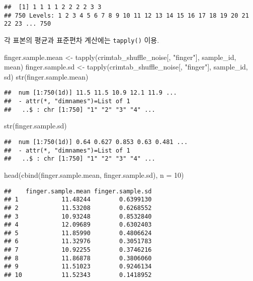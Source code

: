 \documentclass[
]{article}
\newenvironment{Shaded}{\begin{snugshade}}{\end{snugshade}}
\newcommand{\AttributeTok}[1]{\textcolor[rgb]{0.77,0.63,0.00}{#1}}
\newcommand{\DecValTok}[1]{\textcolor[rgb]{0.00,0.00,0.81}{#1}}
\newcommand{\FunctionTok}[1]{\textcolor[rgb]{0.00,0.00,0.00}{#1}}
\newcommand{\NormalTok}[1]{#1}
\newcommand{\OtherTok}[1]{\textcolor[rgb]{0.56,0.35,0.01}{#1}}
\newcommand{\StringTok}[1]{\textcolor[rgb]{0.31,0.60,0.02}{#1}}
\begin{document}
\begin{verbatim}
##  [1] 1 1 1 1 2 2 2 2 3 3
## 750 Levels: 1 2 3 4 5 6 7 8 9 10 11 12 13 14 15 16 17 18 19 20 21 22 23 ... 750
\end{verbatim}

각 표본의 평균과 표준편차 계산에는 \texttt{tapply()} 이용.

\begin{Shaded}
\begin{Highlighting}[]
\NormalTok{finger.sample.mean }\OtherTok{\textless{}{-}} 
  \FunctionTok{tapply}\NormalTok{(crimtab\_shuffle\_noise[, }\StringTok{"finger"}\NormalTok{], sample\_id, mean)}
\NormalTok{finger.sample.sd }\OtherTok{\textless{}{-}} 
  \FunctionTok{tapply}\NormalTok{(crimtab\_shuffle\_noise[, }\StringTok{"finger"}\NormalTok{], sample\_id, sd)}
\FunctionTok{str}\NormalTok{(finger.sample.mean)}
\end{Highlighting}
\end{Shaded}

\begin{verbatim}
##  num [1:750(1d)] 11.5 11.5 10.9 12.1 11.9 ...
##  - attr(*, "dimnames")=List of 1
##   ..$ : chr [1:750] "1" "2" "3" "4" ...
\end{verbatim}

\begin{Shaded}
\begin{Highlighting}[]
\FunctionTok{str}\NormalTok{(finger.sample.sd)}
\end{Highlighting}
\end{Shaded}

\begin{verbatim}
##  num [1:750(1d)] 0.64 0.627 0.853 0.63 0.481 ...
##  - attr(*, "dimnames")=List of 1
##   ..$ : chr [1:750] "1" "2" "3" "4" ...
\end{verbatim}

\begin{Shaded}
\begin{Highlighting}[]
\FunctionTok{head}\NormalTok{(}\FunctionTok{cbind}\NormalTok{(finger.sample.mean, finger.sample.sd), }\AttributeTok{n =} \DecValTok{10}\NormalTok{)}
\end{Highlighting}
\end{Shaded}

\begin{verbatim}
##    finger.sample.mean finger.sample.sd
## 1            11.48244        0.6399130
## 2            11.53208        0.6268552
## 3            10.93248        0.8532840
## 4            12.09689        0.6302403
## 5            11.85990        0.4806624
## 6            11.32976        0.3051783
## 7            10.92255        0.3746216
## 8            11.86878        0.3806060
## 9            11.51023        0.9246134
## 10           11.52343        0.1418952
\end{verbatim}
\end{document}
